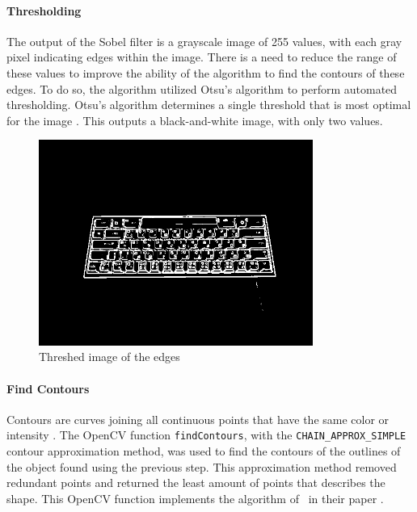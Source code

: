 \documentclass{report}
\begin{document}
\paragraph{Thresholding}
The output of the Sobel filter is a grayscale image of 255 values, with each
gray pixel indicating edges within the image. There is a need to reduce the
range of these values to improve the ability of the algorithm to find the
contours of these edges. To do so, the algorithm utilized Otsu's algorithm to
perform automated thresholding. Otsu's algorithm determines a single threshold
that is most optimal for the image \parencite{otsu}. This outputs a
black-and-white image, with only two values.

\begin{figure}[H]
	\centering
	\includegraphics[width=0.8\textwidth]{threshed.png}
	\caption{Threshed image of the edges}
	\centering
\end{figure}


\paragraph{Find Contours}
\label{section:metho-algo-key-contours}
Contours are curves joining all continuous points that have the same color or
intensity \parencite{opencv-contours}. The OpenCV function
\texttt{findContours}, with the \texttt{CHAIN\_APPROX\_SIMPLE} contour
approximation method, was used to find the contours of the outlines of the
object found using the previous step. This approximation method removed
redundant points and returned the least amount of points that describes the
shape. This OpenCV function implements the algorithm of~\cite{contours} in their
paper .
\end{document}
